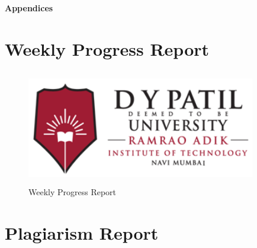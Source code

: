 \documentclass{RAITreport}
\begin{document}


 
 
 
 
 
 \renewcommand{\bibname}{References}\thispagestyle{plain}
 
 

              
%



\newpage
\begin{center}
	\vspace*{11cm}
	\centering
	{  \huge \bfseries Appendices}
\end{center}

\let\cleardoublepage\clearpage
\appendix
\chapter{Weekly Progress Report}
\begin{figure}[h]
	\centering
	\includegraphics[width=10cm, height=5cm]{rait-dypu-logo.png}
	\caption[Weekly Progress Report]{Weekly Progress Report}
	\label{fig:my_label}
\end{figure}
\newpage
\chapter{Plagiarism Report}\thispagestyle{plain}
%
\newpage
\end{document}
